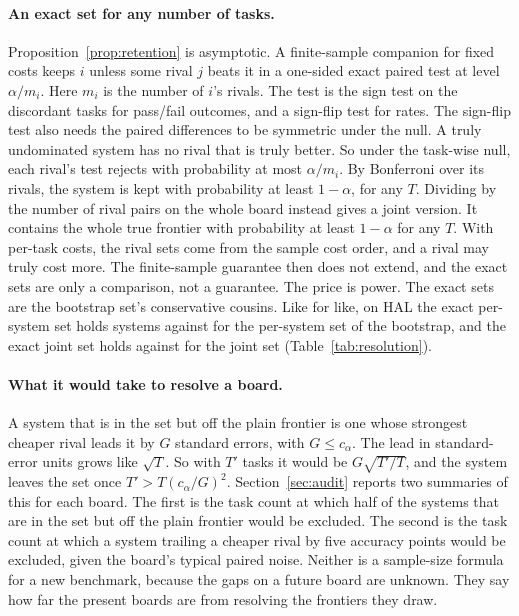 \documentclass[11pt]{article}
\begin{document}
\paragraph{An exact set for any number of tasks.}
\label{sec:exactset}
Proposition~\ref{prop:retention} is asymptotic. A finite-sample companion for fixed costs keeps $i$ unless some rival $j$ beats it in a one-sided exact paired test at level $\alpha/m_i$. Here $m_i$ is the number of $i$'s rivals. The test is the sign test on the discordant tasks for pass/fail outcomes, and a sign-flip test for rates. The sign-flip test also needs the paired differences to be symmetric under the null. A truly undominated system has no rival that is truly better. So under the task-wise null, each rival's test rejects with probability at most $\alpha/m_i$. By Bonferroni over its rivals, the system is kept with probability at least $1-\alpha$, for any $T$. Dividing by the number of rival pairs on the whole board instead gives a joint version. It contains the whole true frontier with probability at least $1-\alpha$ for any $T$. With per-task costs, the rival sets come from the sample cost order, and a rival may truly cost more. The finite-sample guarantee then does not extend, and the exact sets are only a comparison, not a guarantee. The price is power. The exact sets are the bootstrap set's conservative cousins. Like for like, on HAL the exact per-system set holds \NumHalExactSet{} systems against \NumHalPerSystemSet{} for the per-system set of the bootstrap, and the exact joint set holds \NumHalExactJointSet{} against \NumHalFrontierSet{} for the joint set (Table~\ref{tab:resolution}).

\paragraph{What it would take to resolve a board.}
\label{sec:resolve}
A system that is in the set but off the plain frontier is one whose strongest cheaper rival leads it by $G$ standard errors, with $G\le c_\alpha$. The lead in standard-error units grows like $\sqrt T$. So with $T'$ tasks it would be $G\sqrt{T'/T}$, and the system leaves the set once $T'>T(c_\alpha/G)^2$. Section~\ref{sec:audit} reports two summaries of this for each board. The first is the task count at which half of the systems that are in the set but off the plain frontier would be excluded. The second is the task count at which a system trailing a cheaper rival by five accuracy points would be excluded, given the board's typical paired noise. Neither is a sample-size formula for a new benchmark, because the gaps on a future board are unknown. They say how far the present boards are from resolving the frontiers they draw.
\end{document}

